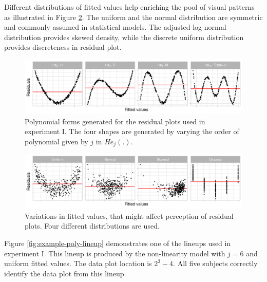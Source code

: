 \documentclass[]{interact}
\theoremstyle{plain}%
\theoremstyle{definition}
\theoremstyle{remark}
\begin{document}
Different distributions of fitted values help enriching the pool of
visual patterns as illustrated in Figure \ref{fig:different-dist}. The
uniform and the normal distribution are symmetric and commonly assumed
in statistical models. The adjusted log-normal distribution provides
skewed density, while the discrete uniform distribution provides
discreteness in residual plot.

\begin{figure}

{\centering \includegraphics[width=1\linewidth]{paper_comparison_files/figure-latex/different-shape-of-herimite-1} 

}

\caption{Polynomial forms generated for the residual plots used in experiment I. The four shapes are generated by varying the order of polynomial given by $j$ in $He_j(.)$.}\label{fig:different-shape-of-herimite}
\end{figure}

\begin{figure}

{\centering \includegraphics[width=1\linewidth]{paper_comparison_files/figure-latex/different-dist-1} 

}

\caption{Variations in fitted values, that might affect perception of residual plots. Four different distributions are used.}\label{fig:different-dist}
\end{figure}

Figure \ref{fig:example-poly-lineup} demonstrates one of the lineups
used in experiment I. This lineup is produced by the non-linearity model
with \(j = 6\) and uniform fitted values. The data plot location is
\(2^3 - 4\). All five subjects correctly identify the data plot from
this lineup.
\end{document}
